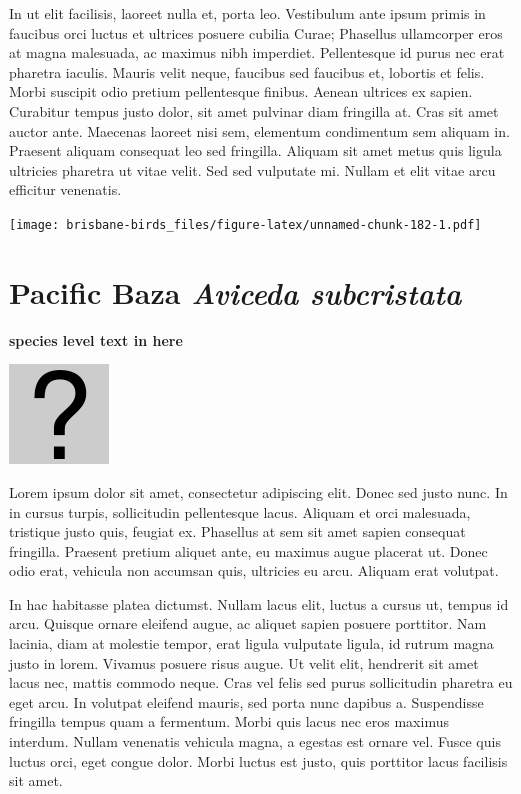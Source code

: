 \documentclass[]{book}
\let\origfigure\figure
\let\endorigfigure\endfigure
\renewenvironment{figure}[1][2] {
  \expandafter\origfigure\expandafter[H]
} {
  \endorigfigure
}
\begin{document}
In ut elit facilisis, laoreet nulla et, porta leo. Vestibulum ante ipsum
primis in faucibus orci luctus et ultrices posuere cubilia Curae;
Phasellus ullamcorper eros at magna malesuada, ac maximus nibh
imperdiet. Pellentesque id purus nec erat pharetra iaculis. Mauris velit
neque, faucibus sed faucibus et, lobortis et felis. Morbi suscipit odio
pretium pellentesque finibus. Aenean ultrices ex sapien. Curabitur
tempus justo dolor, sit amet pulvinar diam fringilla at. Cras sit amet
auctor ante. Maecenas laoreet nisi sem, elementum condimentum sem
aliquam in. Praesent aliquam consequat leo sed fringilla. Aliquam sit
amet metus quis ligula ultricies pharetra ut vitae velit. Sed sed
vulputate mi. Nullam et elit vitae arcu efficitur venenatis.

\begin{figure}
\centering
\texttt{[image: brisbane-birds\_files/figure-latex/unnamed-chunk-182-1.pdf]}
\caption{\label{fig:unnamed-chunk-182}insert figure caption}
\end{figure}

\section{\texorpdfstring{Pacific Baza \emph{Aviceda
subcristata}}{Pacific Baza Aviceda subcristata}}\label{pacific-baza-aviceda-subcristata}

\textbf{species level text in here}

\begin{figure}
\centering
\includegraphics{assets/missing.png}
\caption{No image for species}
\end{figure}

Lorem ipsum dolor sit amet, consectetur adipiscing elit. Donec sed justo
nunc. In in cursus turpis, sollicitudin pellentesque lacus. Aliquam et
orci malesuada, tristique justo quis, feugiat ex. Phasellus at sem sit
amet sapien consequat fringilla. Praesent pretium aliquet ante, eu
maximus augue placerat ut. Donec odio erat, vehicula non accumsan quis,
ultricies eu arcu. Aliquam erat volutpat.

In hac habitasse platea dictumst. Nullam lacus elit, luctus a cursus ut,
tempus id arcu. Quisque ornare eleifend augue, ac aliquet sapien posuere
porttitor. Nam lacinia, diam at molestie tempor, erat ligula vulputate
ligula, id rutrum magna justo in lorem. Vivamus posuere risus augue. Ut
velit elit, hendrerit sit amet lacus nec, mattis commodo neque. Cras vel
felis sed purus sollicitudin pharetra eu eget arcu. In volutpat eleifend
mauris, sed porta nunc dapibus a. Suspendisse fringilla tempus quam a
fermentum. Morbi quis lacus nec eros maximus interdum. Nullam venenatis
vehicula magna, a egestas est ornare vel. Fusce quis luctus orci, eget
congue dolor. Morbi luctus est justo, quis porttitor lacus facilisis sit
amet.
\end{document}

